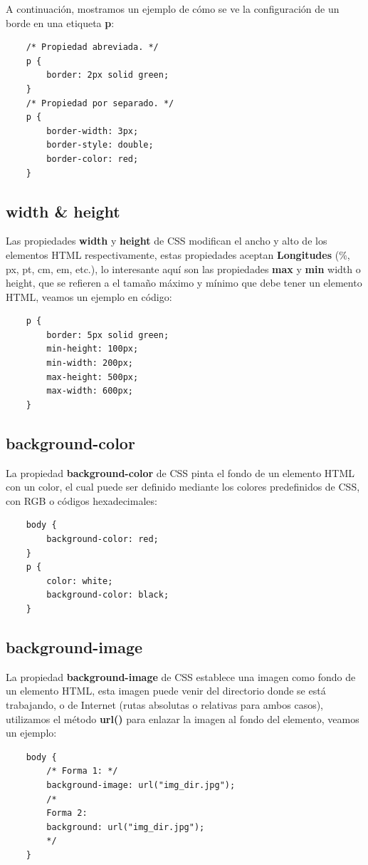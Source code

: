 A continuación, mostramos un ejemplo de cómo se ve la configuración de un borde en una etiqueta \textbf{p}:
\begin{lstlisting}
    /* Propiedad abreviada. */
    p {
        border: 2px solid green;
    }
    /* Propiedad por separado. */
    p {
        border-width: 3px;
        border-style: double;
        border-color: red;
    }
\end{lstlisting}


\subsection{width \& height}

Las propiedades \textbf{width} y \textbf{height} de CSS modifican el ancho y alto de los elementos HTML respectivamente, estas propiedades aceptan \textbf{Longitudes} (\%, px, pt, cm, em, etc.), lo interesante aquí son las propiedades \textbf{max} y \textbf{min} width o height, que se refieren a el tamaño máximo y mínimo que debe tener un elemento HTML, veamos un ejemplo en código:
\begin{lstlisting}
    p {
        border: 5px solid green;
        min-height: 100px;
        min-width: 200px;
        max-height: 500px;
        max-width: 600px;
    }
\end{lstlisting}


\subsection{background-color}

La propiedad \textbf{background-color} de CSS pinta el fondo de un elemento HTML con un color, el cual puede ser definido mediante los colores predefinidos de CSS, con RGB o códigos hexadecimales:
\begin{lstlisting}
    body {
        background-color: red;
    }
    p {
        color: white;
        background-color: black;
    }
\end{lstlisting}


\subsection{background-image}

La propiedad \textbf{background-image} de CSS establece una imagen como fondo de un elemento HTML, esta imagen puede venir del directorio donde se está trabajando, o de Internet (rutas absolutas o relativas para ambos casos), utilizamos el método \textbf{url()} para enlazar la imagen al fondo del elemento, veamos un ejemplo:
\begin{lstlisting}
    body {
        /* Forma 1: */
        background-image: url("img_dir.jpg");
        /*
        Forma 2: 
        background: url("img_dir.jpg");
        */
    }
\end{lstlisting}

